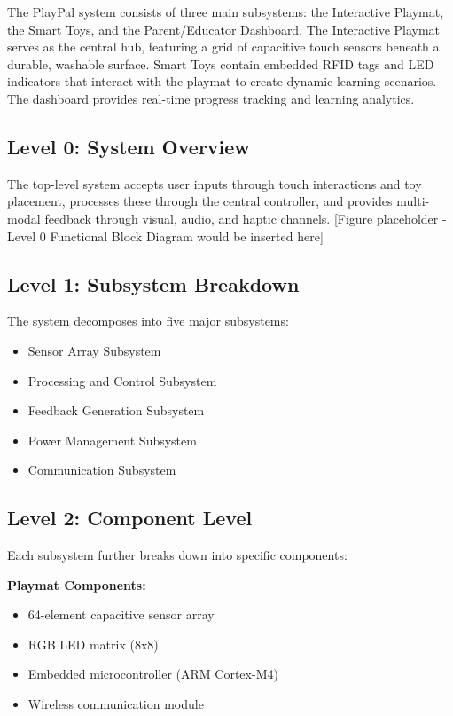 \documentclass[final]{designreport}
\begin{document}
\designsummary
The PlayPal system consists of three main subsystems: the Interactive Playmat, the Smart Toys, and the Parent/Educator Dashboard. The Interactive Playmat serves as the central hub, featuring a grid of capacitive touch sensors beneath a durable, washable surface. Smart Toys contain embedded RFID tags and LED indicators that interact with the playmat to create dynamic learning scenarios. The dashboard provides real-time progress tracking and learning analytics.

\functionaldecomp

\subsection{Level 0: System Overview}

The top-level system accepts user inputs through touch interactions and toy placement, processes these through the central controller, and provides multi-modal feedback through visual, audio, and haptic channels. [Figure placeholder - Level 0 Functional Block Diagram would be inserted here]

\subsection{Level 1: Subsystem Breakdown}
The system decomposes into five major subsystems:
\begin{itemize}
    \item Sensor Array Subsystem
    \item Processing and Control Subsystem  
    \item Feedback Generation Subsystem
    \item Power Management Subsystem
    \item Communication Subsystem
\end{itemize}

\subsection{Level 2: Component Level}
Each subsystem further breaks down into specific components:

\textbf{Playmat Components:}
\begin{itemize}
    \item 64-element capacitive sensor array
    \item RGB LED matrix (8x8)
    \item Embedded microcontroller (ARM Cortex-M4)
    \item Wireless communication module
\end{itemize}
\end{document}
